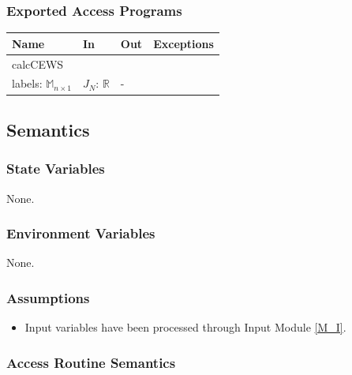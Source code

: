 \documentclass[12pt, titlepage]{article}
\begin{document}
\subsubsection{Exported Access Programs}

\begin{center}
\begin{tabular}{p{2cm} p{4cm} p{4cm} p{2cm}}
\hline
\textbf{Name} & \textbf{In} & \textbf{Out} & \textbf{Exceptions} \\
\hline
calcCEWS & \makecell[1]{data: $\mathbb{M}_{n \times m}$ \\ labels: $\mathbb{M}_{n \times 1}$} & $J_N$: $\mathbb{R}$ & - \\
\hline
\end{tabular}
\end{center}

\subsection{Semantics}
\subsubsection{State Variables}
None.

\subsubsection{Environment Variables}
None.

\subsubsection{Assumptions}
\begin{itemize}
\item Input variables have been processed through Input Module \ref{M_I}.
\end{itemize}

\subsubsection{Access Routine Semantics}
\end{document}
